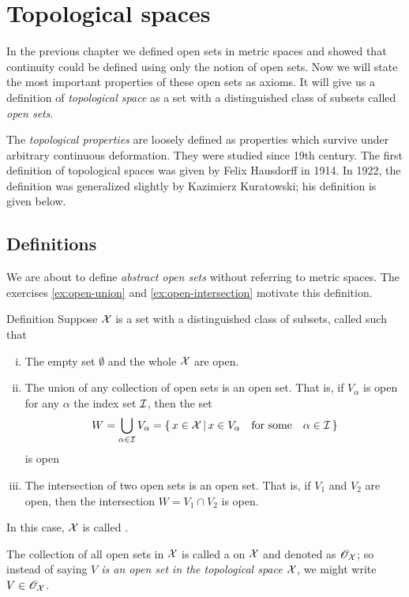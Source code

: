 \chapter{Topological spaces}


In the previous chapter we defined open sets in metric spaces 
and showed that continuity could be defined using only the notion of open sets.
Now we will state the most important properties of these open sets as axioms.
It will give us a definition of \emph{topological space} as a set with a distinguished class of subsets called \emph{open sets}.

The \emph{topological properties} are loosely defined as properties which survive under arbitrary continuous deformation.
They were studied since 19th century.
The first definition of topological spaces was given by Felix Hausdorff in 1914.
In 1922, the definition was generalized slightly by Kazimierz Kuratowski; his definition is given below.

\section{Definitions}

We are about to define \emph{abstract open sets} without referring to metric spaces.
The exercises \ref{ex:open-union} and \ref{ex:open-intersection} motivate this definition.

\begin{thm}{Definition}\label{def:top-space}
Suppose $\mathcal{X}$ is a set 
with a distinguished class of subsets, called  such that
\begin{enumerate}[(i)] 
\item\label{def:top-space:empty} The empty set $\emptyset$ and the whole $\mathcal{X}$ are open.
\item\label{def:top-space:u} The union of any collection of open sets is an open set.
That is, if $V_\alpha$ is open for any $\alpha$ the index set $\mathcal{I}$, 
then the set
\[W=\bigcup_{\alpha\in \mathcal{I}} V_\alpha
=
\left\{\,{x\in \mathcal{X}}\,\middle|\,{x\in V_\alpha\quad\text{for some}\quad\alpha\in \mathcal{I}}\,\right\}\]
is open
\item\label{def:top-space:n} The intersection of two open sets is an open set.  
That is, if $V_1$ and $V_2$ are open, then the intersection $W=V_1 \cap V_2$ is open. 
\end{enumerate}
In this case, $\mathcal{X}$ is called .

The collection of all open sets in  $\mathcal{X}$ is called a  on $\mathcal{X}$ and denoted as $\mathscr{O}_{\mathcal{X}}$;
so instead of saying \emph{$V$ is an open set in the topological space $\mathcal{X}$}, we might write $V\in \mathscr{O}_{\mathcal{X}}$.
\end{thm}

